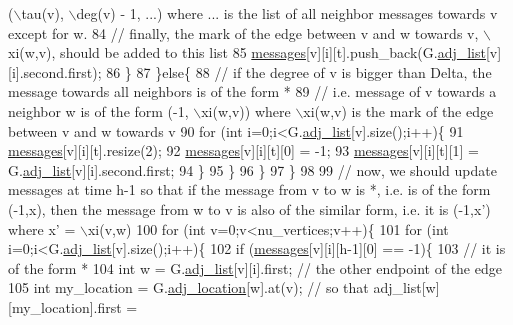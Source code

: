 \begin{DoxyCode}
{       (\(\backslash\)tau(v), \(\backslash\)deg(v) - 1, ...) where ... is the list of all neighbor messages towards v except for w. }
84           \textcolor{comment}{// finally, the mark of the edge between v and w towards v, \(\backslash\)xi(w,v), should be added to this
       list}
85           \hyperlink{classgraph__message_a06a1d1ab91b4891c65ea80205566f800}{messages}[v][i][t].push\_back(G.\hyperlink{classmarked__graph_a1a0bf7ca413a278763f7c878b3b6fd6f}{adj\_list}[v][i].second.first);
86         \}
87       \}\textcolor{keywordflow}{else}\{
88         \textcolor{comment}{// if the degree of v is bigger than Delta, the message towards all neighbors is of the form *}
89         \textcolor{comment}{// i.e. message of v towards a neighbor w is of the form (-1, \(\backslash\)xi(w,v)) where \(\backslash\)xi(w,v) is the mark
       of the edge between v and w towards v}
90         \textcolor{keywordflow}{for} (\textcolor{keywordtype}{int} i=0;i<G.\hyperlink{classmarked__graph_a1a0bf7ca413a278763f7c878b3b6fd6f}{adj\_list}[v].size();i++)\{
91           \hyperlink{classgraph__message_a06a1d1ab91b4891c65ea80205566f800}{messages}[v][i][t].resize(2);
92           \hyperlink{classgraph__message_a06a1d1ab91b4891c65ea80205566f800}{messages}[v][i][t][0] = -1;
93           \hyperlink{classgraph__message_a06a1d1ab91b4891c65ea80205566f800}{messages}[v][i][t][1] = G.\hyperlink{classmarked__graph_a1a0bf7ca413a278763f7c878b3b6fd6f}{adj\_list}[v][i].second.first;
94         \}
95       \}
96     \}
97   \}
98 
99   \textcolor{comment}{// now, we should update messages at time h-1 so that if the message from v to w is *, i.e. is of the
       form (-1,x), then the message from w to v is also of the similar form, i.e. it is (-1,x') where x' = \(\backslash\)xi(v,w)}
100   \textcolor{keywordflow}{for} (\textcolor{keywordtype}{int} v=0;v<nu\_vertices;v++)\{
101     \textcolor{keywordflow}{for} (\textcolor{keywordtype}{int} i=0;i<G.\hyperlink{classmarked__graph_a1a0bf7ca413a278763f7c878b3b6fd6f}{adj\_list}[v].size();i++)\{
102       \textcolor{keywordflow}{if} (\hyperlink{classgraph__message_a06a1d1ab91b4891c65ea80205566f800}{messages}[v][i][h-1][0] == -1)\{
103         \textcolor{comment}{// it is of the form *}
104         \textcolor{keywordtype}{int} w = G.\hyperlink{classmarked__graph_a1a0bf7ca413a278763f7c878b3b6fd6f}{adj\_list}[v][i].first; \textcolor{comment}{// the other endpoint of the edge}
105         \textcolor{keywordtype}{int} my\_location = G.\hyperlink{classmarked__graph_a3ae722ea9583ad23af34d789a88ac01a}{adj\_location}[w].at(v); \textcolor{comment}{// so that adj\_list[w][my\_location].first =
}
\end{DoxyCode}
